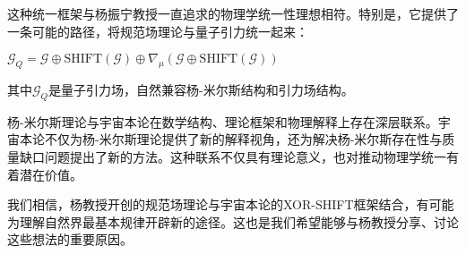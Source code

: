 这种统一框架与杨振宁教授一直追求的物理学统一性理想相符。特别是，它提供了一条可能的路径，将规范场理论与量子引力统一起来：

$\mathcal{G}_Q = \mathcal{G} \oplus \text{SHIFT}(\mathcal{G}) \oplus \nabla_{\mu}(\mathcal{G} \oplus \text{SHIFT}(\mathcal{G}))$

其中$\mathcal{G}_Q$是量子引力场，自然兼容杨-米尔斯结构和引力场结构。

杨-米尔斯理论与宇宙本论在数学结构、理论框架和物理解释上存在深层联系。宇宙本论不仅为杨-米尔斯理论提供了新的解释视角，还为解决杨-米尔斯存在性与质量缺口问题提出了新的方法。这种联系不仅具有理论意义，也对推动物理学统一有着潜在价值。

我们相信，杨教授开创的规范场理论与宇宙本论的XOR-SHIFT框架结合，有可能为理解自然界最基本规律开辟新的途径。这也是我们希望能够与杨教授分享、讨论这些想法的重要原因。 